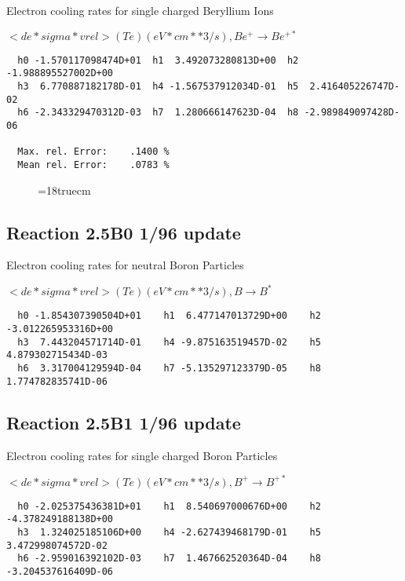   Electron cooling rates for single
  charged Beryllium Ions

 $<de*sigma*vrel>(Te)  (eV*cm**3/s), Be^+ \rightarrow Be^{+*} $

\begin{verbatim}
  h0 -1.570117098474D+01  h1  3.492073280813D+00  h2 -1.988895527002D+00
  h3  6.770887182178D-01  h4 -1.567537912034D-01  h5  2.416405226747D-02
  h6 -2.343329470312D-03  h7  1.280666147623D-04  h8 -2.989849097428D-06

  Max. rel. Error:    .1400 %
  Mean rel. Error:    .0783 %

\end{verbatim}

\begin{figure} \label{2.4Bl}
\epsfxsize=18truecm
\end{figure}
\newpage

\subsection{
Reaction 2.5B0                     1/96 update
}

 Electron cooling rates for neutral
 Boron Particles

$ <de*sigma*vrel>(Te)  (eV*cm**3/s), B   \rightarrow B^* $


\begin{verbatim}
  h0 -1.854307390504D+01    h1  6.477147013729D+00    h2 -3.012265953316D+00
  h3  7.443204571714D-01    h4 -9.875163519457D-02    h5  4.879302715434D-03
  h6  3.317004129594D-04    h7 -5.135297123379D-05    h8  1.774782835741D-06
\end{verbatim}

\subsection{
Reaction 2.5B1                     1/96 update
}

 Electron cooling rates for single
 charged Boron Particles

 $<de*sigma*vrel>(Te)  (eV*cm**3/s), B^+ \rightarrow B^{+*} $


\begin{verbatim}
  h0 -2.025375436381D+01    h1  8.540697000676D+00    h2 -4.378249188138D+00
  h3  1.324025185106D+00    h4 -2.627439468179D-01    h5  3.472998074572D-02
  h6 -2.959016392102D-03    h7  1.467662520364D-04    h8 -3.204537616409D-06
\end{verbatim}

